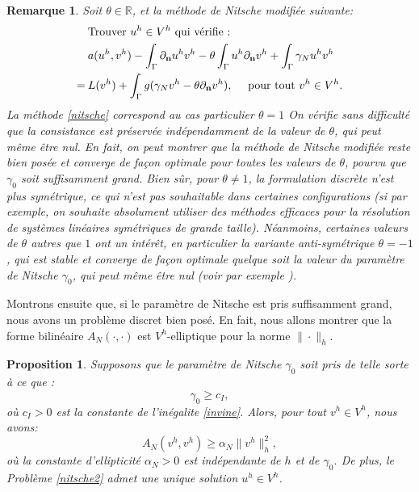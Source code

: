 \documentclass[11pt]{book}
\newtheorem{remark}[theorem]{Remarque}
\newtheorem{proposition}[theorem]{Proposition}
\newcommand{\br}{\begin{remark}}
\newcommand{\er}{\end{remark}}
\newcommand{\bp}{\begin{proposition}}
\newcommand{\ep}{\end{proposition}}
\def\n{{\bf n}}
\newcommand{\R}{\mathbb{R}}
\newcommand{\dnu}{\partial_{\n} u}
\newcommand{\dnv}{\partial_{\n} v}
\begin{document}
\br Soit $\theta \in \R$, et la méthode de Nitsche modifiée suivante:
\begin{align} 
\label{nitsche-theta}
&\textrm{Trouver } u^h \in V^h \textrm{ qui vérifie :}\nonumber\\
&%
a(u^h,v^h) 
- \int_\Gamma \dnu^h v^h
- \theta \int_\Gamma u^h \dnv^h
+ \int_\Gamma \gamma_N u^h v^h \nonumber \\= \:&L(v^h) 
+ \int_\Gamma  g ( \gamma_N v^h - \theta \dnv^h ), 
\quad \textrm{ pour tout } v^h \in V^h.
\end{align}
La méthode \eqref{nitsche} correspond au cas particulier $\theta=1$
On vérifie sans difficulté que la consistance est préservée indépendamment de la valeur de $\theta$, qui peut même être nul. En fait, on peut montrer que la méthode de Nitsche modifiée reste bien posée et converge de façon optimale pour toutes les valeurs de $\theta$, pourvu que $\gamma_0$ soit suffisamment grand. Bien sûr, pour $\theta \neq 1$, la formulation discrète n'est plus symétrique, ce qui n'est pas souhaitable dans certaines configurations (si par exemple, on souhaite absolument utiliser des méthodes efficaces pour la résolution de systèmes linéaires symétriques de grande taille). Néanmoins, certaines valeurs de $\theta$ autres que $1$ ont un intérêt, en particulier la variante anti-symétrique $\theta=-1$, qui est stable et converge de façon optimale quelque soit la valeur du paramètre de Nitsche $\gamma_0$, qui peut même être nul (voir par exemple \cite{burman-12}).
\er

Montrons ensuite que, si le paramètre de Nitsche est pris suffisamment grand, nous avons un problème discret bien posé. En fait, nous allons montrer que la forme bilinéaire $A_N (\cdot,\cdot)$ est $V^h$-elliptique pour la norme $\| \cdot \|_h$.

\bp Supposons que le paramètre de Nitsche $\gamma_0$ soit pris de telle sorte à ce que :
\[
 \gamma_0 \geq c_I,
\]
où $c_I > 0$ est la constante de l'inégalite \eqref{invine}. Alors, pour tout $v^h \in V^h$, nous avons:
\[
 A_N ( v^h , v^h ) \geq \alpha_N \| v^h \|^2_h,
\]
où la constante d'ellipticité $\alpha_N > 0$ est indépendante de $h$ et de $\gamma_0$.
De plus, le Problème \eqref{nitsche2} admet une unique solution $u^h \in V^h$.
\ep
\end{document}
